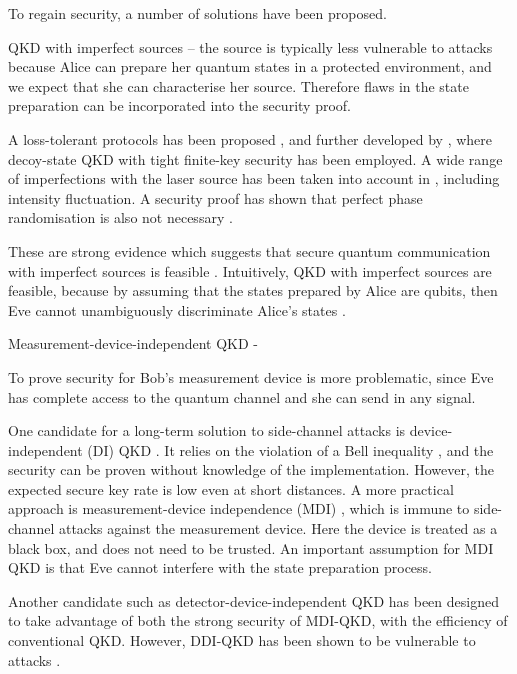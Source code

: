 To regain security, a number of solutions have been proposed. 

QKD with imperfect sources -- the source is typically less vulnerable to attacks because Alice can prepare her quantum states in a protected environment, and we expect that she can characterise her source. Therefore flaws in the state preparation can be incorporated into the security proof.

A loss-tolerant protocols has been proposed \cite{bib:PhysRevA.90.052314}, and further developed by \cite{bib:PhysRevA.92.032305}, where decoy-state QKD with tight finite-key security has been employed. A wide range of imperfections with the laser source has been taken into account in \cite{bib:mizutani2015finite}, including intensity fluctuation. A security proof has shown that perfect phase randomisation is also not necessary \cite{bib:cao2015discrete}.

These are strong evidence which suggests that secure quantum communication with imperfect sources is feasible \cite{bib:diamanti2016practical}. Intuitively, QKD with imperfect sources are feasible, because by assuming that the states prepared by Alice are qubits, then Eve cannot unambiguously discriminate Alice's states \cite{bib:diamanti2016practical}. 

Measurement-device-independent QKD -

To prove security for Bob's measurement device is more problematic, since Eve has complete access to the quantum channel and she can send in any signal. 

One candidate for a long-term solution to side-channel attacks is device-independent (DI) QKD \cite{bib:PhysRevLett.98.230501}. It relies on the violation of a Bell inequality \cite{bib:hensen2015loophole}, and the security can be proven without knowledge of the implementation. However, the expected secure key rate is low even at short distances. A more practical approach is measurement-device independence (MDI) \cite{bib:PhysRevLett.108.130503}, which is immune to side-channel attacks against the measurement device. Here the device is treated as a black box, and does not need to be trusted. An important assumption for MDI QKD is that Eve cannot interfere with the state preparation process. 

Another candidate such as detector-device-independent \cite{bib:lim2014detector, bib:PhysRevA.92.022337} QKD has been designed to take advantage of both the strong security of MDI-QKD, with the efficiency of conventional QKD. However, DDI-QKD has been shown to be vulnerable to attacks \cite{bib:PhysRevLett.117.250505}. 

